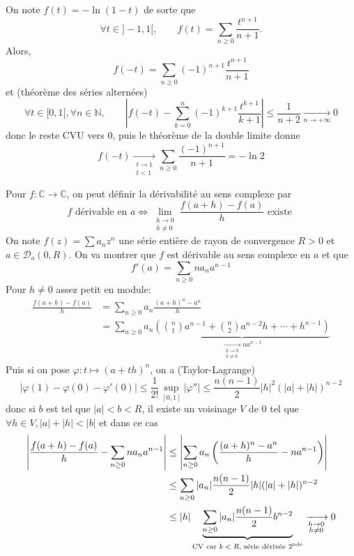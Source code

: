 \begin{ex}
    On note $f(t)=-\ln(1-t)$ de sorte que \[
        \forall t\in ]-1, 1[, \qquad f(t)=\sum_{n\geq 0}\frac{t^{n+1}}{n+1}.
    \]
    Alors, \[
        f(-t)=\sum_{n\geq 0}(-1)^{n+1}\frac{t^{n+1}}{n+1}
    \]
    et (théorème des séries alternées) \[
        \forall t\in[0, 1[, \forall n\in\mathbb N, \qquad \left|f(-t)-\sum_{k=0}^n(-1)^{k+1}\frac{t^{k+1}}{k+1}\right|\leq \frac1{n+2}\xrightarrow[n\to+\infty]{}0
    \]
    donc le reste CVU vers $0$, puis le théorème de la double limite donne \[
        f(-t)\xrightarrow[\substack{t\to1\\t<1}]{}\sum_{n\geq 0}\frac{(-1)^{n+1}}{n+1}=-\ln2
    \]
\end{ex}

\begin{rem}
    Pour $f:\mathbb C\longrightarrow \mathbb C$, on peut définir la dérivabilité au sens complexe par \[
        f \text{ dérivable en } a\iff \lim_{\substack{h\to0\\h\neq 0}}\frac{f(a+h)-f(a)}h\text{ existe }
    \]
    On note $f(z)=\sum a_nz^n$ une série entière de rayon de convergence $R>0$ et $a\in\mathcal D_o(0, R)$. On va montrer que $f$ est dérivable au sens complexe en $a$ et que \[
        f'(a)=\sum_{n\geq 0}na_na^{n-1}
    \]
    Pour $h\neq 0$ assez petit en module: 
    \begin{align*}
        \frac{f(a+h)-f(a)}h&=\sum_{n\geq 0}a_n\frac{(a+h)^n-a^n}h\\&=\sum_{n\geq 0}a_n\underbrace{\left(\binom n1a^{n-1}+\binom n2a^{n-2}h+\cdots+h^{n-1}\right)}_{\displaystyle\xrightarrow[\substack{h\to0\\h\neq 0}]{}na^{n-1}}
    \end{align*}
    Puis si on pose $\varphi:t\longmapsto (a+th)^n$, on a (Taylor-Lagrange) \[
        |\varphi(1)-\varphi(0)-\varphi'(0)|\leq \frac1{2!}\sup_{[0,1]}|\varphi''|\leq \frac{n(n-1)}2|h|^2(|a|+|h|)^{n-2}
    \]
    donc si $b$ est tel que $|a|<b<R$, il existe un voisinage $V$ de $0$ tel que $\forall h\in V, |a|+|h|<|b|$ et dans ce cas
    \begin{align*}
        \left|  \frac{f(a+h)-f(a)}h-\sum_{n\geq 0}na_na^{n-1}\right|&\leq \left| \sum_{n\geq 0}a_n \left( \frac{(a+h)^n-a^n}h-na^{n-1} \right) \right| \\
                                                                    &\leq \sum_{n\geq 0}|a_n|\frac{n(n-1)}2|h|(|a|+|h|)^{n-2}\\
                                                                    &\leq |h|\underbrace{\sum_{n\geq 0}|a_n|\frac{n(n-1)}2b^{n-2}}_{\text{CV car $b<R$, série dérivée 2\textsuperscript{nde}}}\xrightarrow[\substack{h\to0\\h\neq 0}]{}0
    \end{align*}
\end{rem}

